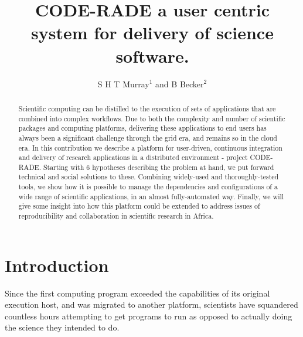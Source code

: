 \documentclass[a4paper]{jpconf}
\begin{document}
\title{CODE-RADE a user centric system for delivery of science software.}

\author{S H T Murray$^1$ and B Becker$^2$}

\address{$^1$ Center for High Performance Computing, CSIR, Rosebank, Cape Town, South Africa}
\address{$^2$ Meraka Cyberinfrastructure, CSIR, Lynwood, Pretoria, , South Africa}


\begin{abstract}
Scientific computing can be distilled to the execution of sets 
of applications that are combined into complex workflows. Due to both the complexity and number of 
scientific packages and computing platforms, delivering these applications to end users has always 
been a significant challenge through the grid era, and remains so in the cloud era. In this contribution 
we describe a platform for user-driven, continuous integration and delivery of research applications 
in a distributed environment - project CODE-RADE. Starting with 6 hypotheses describing the problem at 
hand, we put forward technical and social solutions to these. Combining widely-used and thoroughly-tested 
tools, we show how it is possible to manage the dependencies and configurations of a wide range of 
scientific applications, in an almost fully-automated way. 
Finally, we will give some insight into how this platform could be extended to address 
issues of reproducibility and collaboration in scientific research in Africa.
\end{abstract}

\section{Introduction}
Since the first computing program exceeded the capabilities of its original execution host, and was 
migrated to another platform, scientists have squandered countless hours attempting to 
get programs to run as opposed to actually doing the science they intended to do.
\end{document}
